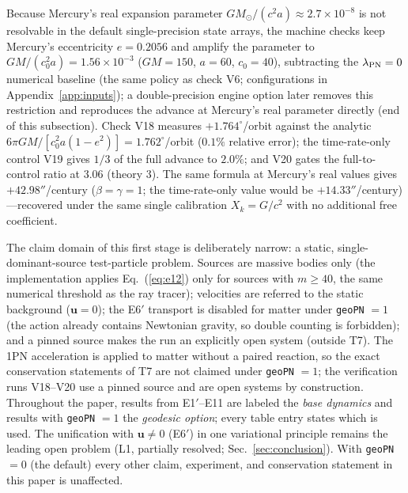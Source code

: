 \documentclass[aps,reprint,amsmath,amssymb,nofootinbib,superscriptaddress,floatfix]{revtex4-2}
\newcommand{\vect}[1]{\bm{#1}}
\newcommand{\Kt}{X_k}
\begin{document}
Because Mercury's real expansion parameter
$GM_\odot/(c^2a) \approx 2.7\times10^{-8}$ is not resolvable in the
default single-precision state arrays, the
machine checks keep Mercury's
eccentricity $e = 0.2056$ and amplify the parameter to
$GM/(c_0^2a) = 1.56\times10^{-3}$ ($GM = 150$, $a = 60$, $c_0 = 40$),
subtracting the $\lambda_{\rm PN} = 0$ numerical baseline (the same
policy as check V6; configurations in Appendix~\ref{app:inputs});
a double-precision engine option later removes this restriction and
reproduces the advance at Mercury's real parameter directly (end of
this subsection).
Check V18 measures $+1.764^\circ$/orbit against the analytic
$6\pi GM/[c_0^2a(1-e^2)] = 1.762^\circ$/orbit ($0.1\%$ relative
error); the time-rate-only control V19 gives $1/3$ of the full advance
to $2.0\%$; and V20 gates the full-to-control ratio at $3.06$ (theory
$3$).
The same formula at Mercury's real values gives $+42.98''$/century
($\beta = \gamma = 1$; the time-rate-only value would be
$+14.33''$/century)---recovered under the same single calibration
$\Kt = G/c^2$ with no additional free coefficient.

The claim domain of this first stage is deliberately narrow: a static,
single-dominant-source test-particle problem.
Sources are massive bodies only (the implementation applies
Eq.~(\ref{eq:e12}) only for sources with $m \ge 40$, the same
numerical threshold as the ray tracer); velocities are referred to the
static background ($\vect{u} = 0$); the E6$'$ transport is disabled
for matter under \texttt{geoPN} $= 1$ (the action already contains
Newtonian gravity, so double counting is forbidden); and a pinned
source makes the run an explicitly open system (outside T7).
The 1PN acceleration is applied to matter without a paired reaction,
so the exact conservation statements of T7 are not claimed under
\texttt{geoPN} $= 1$; the verification runs V18--V20 use a pinned
source and are open systems by construction.
Throughout the paper, results from E1$'$--E11 are labeled the
\emph{base dynamics} and results with \texttt{geoPN} $= 1$ the
\emph{geodesic option}; every table entry states which is used.
The unification with $\vect{u} \ne 0$ (E6$'$) in one variational
principle remains the leading open problem (L1, partially resolved;
Sec.~\ref{sec:conclusion}).
With \texttt{geoPN} $= 0$ (the default) every other claim, experiment,
and conservation statement in this paper is unaffected.
\end{document}
